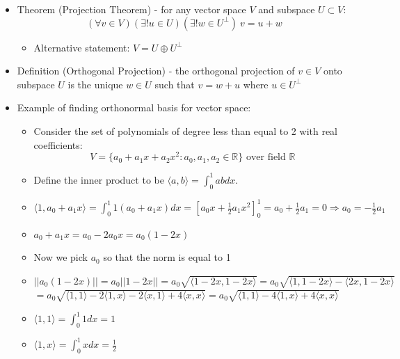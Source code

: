 \documentclass{article}
\begin{document}
\begin{itemize}
    \begin{itemize}
        \item Example: the standard basis of $\mathbb{R}^2$
        \[
        \{(1,0)^T, (0,1)^T\}
        \]
        is orthonormal with respect to the dot product
    \end{itemize}
    \item Theorem (Projection Theorem) - for any vector space $V$ and subspace $U \subset V:$
    \[
    (\forall v \in V)(\exists !u \in U)(\exists !w \in U^{\perp}) \ v = u+w
    \]
    \begin{itemize}
        \item Alternative statement: $V = U \oplus U^{\perp}$
    \end{itemize}
    \item Definition (Orthogonal Projection) - the orthogonal projection of $v \in V$ onto subspace $U$ is the unique $w \in U$ such that $v = w+u$ where $u \in U^{\perp}$
    \item Example of finding orthonormal basis for vector space:
    \begin{itemize}
        \item Consider the set of polynomials of degree less than equal to 2 with real coefficients:
        \[
        V = \{ a_0 + a_1 x + a_2 x^2 : a_0,a_1,a_2 \in \mathbb{R} \} \text{ over field } \mathbb{R}
        \]
        \item Define the inner product to be $\langle a,b \rangle = \int_0^1 ab dx$.
        \item $\langle 1, a_0 + a_1x \rangle = \int_0^1 1(a_0 + a_1x)dx = \left[ a_0x + \frac{1}{2} a_1 x^2 \right]_0^1 = a_0 + \frac{1}{2}a_1 = 0 \Rightarrow a_0 = -\frac{1}{2} a_1$
        \item $a_0 + a_1x = a_0 - 2a_0x = a_0(1-2x)$
        \item Now we pick $a_0$ so that the norm is equal to 1
        \item $\vert \vert a_0 (1-2x) \vert \vert = a_0 \vert \vert 1-2x \vert \vert = a_0 \sqrt{\langle 1-2x, 1-2x \rangle} = a_0 \sqrt{\langle 1, 1-2x \rangle - \langle 2x,1-2x \rangle}$ \\
        $= a_0 \sqrt{\langle 1,1 \rangle - 2 \langle 1,x \rangle - 2 \langle x,1 \rangle + 4 \langle x,x \rangle} = a_0 \sqrt{\langle 1,1 \rangle - 4 \langle 1,x \rangle + 4 \langle x,x \rangle}$
        \item $\langle 1,1 \rangle = \int_0^1 1dx = 1$
        \item $\langle 1,x \rangle = \int_0^1 xdx = \frac{1}{2}$

\end{itemize}
\end{itemize}
\end{document}
